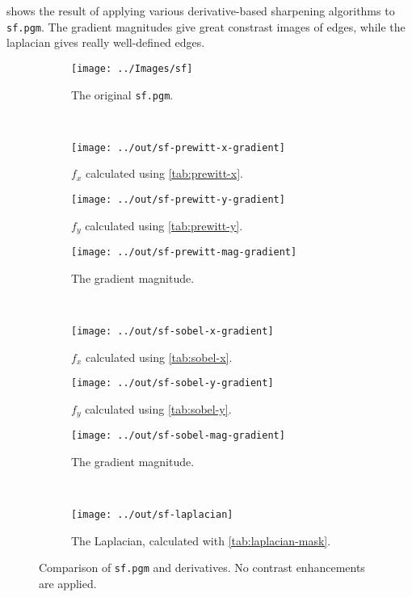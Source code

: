\documentclass[headings=optiontoheadandtoc,listof=totoc,parskip=full]{scrartcl}
\begin{document}
 shows the result of applying various derivative-based sharpening algorithms to \texttt{sf.pgm}. The gradient magnitudes give great constrast images of edges, while the laplacian gives really well-defined edges.

\begin{figure}[H]
	\centering
	\begin{subfigure}[t]{.3\textwidth}
		\centering
		\texttt{[image: ../Images/sf]}
		\caption{The original \texttt{sf.pgm}.}
	\end{subfigure}
	\\
	\begin{subfigure}[t]{.3\textwidth}
		\centering
		\texttt{[image: ../out/sf-prewitt-x-gradient]}
		\caption{$f_x$ calculated using \cref{tab:prewitt-x}.}
	\end{subfigure}
	\hfill
	\begin{subfigure}[t]{.3\textwidth}
		\centering
		\texttt{[image: ../out/sf-prewitt-y-gradient]}
		\caption{$f_y$ calculated using \cref{tab:prewitt-y}.}
	\end{subfigure}
	\hfill
	\begin{subfigure}[t]{.3\textwidth}
		\centering
		\texttt{[image: ../out/sf-prewitt-mag-gradient]}
		\caption{The gradient magnitude.}
	\end{subfigure}
	\\
	\begin{subfigure}[t]{.3\textwidth}
		\centering
		\texttt{[image: ../out/sf-sobel-x-gradient]}
		\caption{$f_x$ calculated using \cref{tab:sobel-x}.}
	\end{subfigure}
	\hfill
	\begin{subfigure}[t]{.3\textwidth}
		\centering
		\texttt{[image: ../out/sf-sobel-y-gradient]}
		\caption{$f_y$ calculated using \cref{tab:sobel-y}.}
	\end{subfigure}
	\hfill
	\begin{subfigure}[t]{.3\textwidth}
		\centering
		\texttt{[image: ../out/sf-sobel-mag-gradient]}
		\caption{The gradient magnitude.}
	\end{subfigure}
	\\
	\begin{subfigure}[t]{.3\textwidth}
		\centering
		\texttt{[image: ../out/sf-laplacian]}
		\caption{The Laplacian, calculated with \cref{tab:laplacian-mask}.}
	\end{subfigure}

	\caption{Comparison of \texttt{sf.pgm} and derivatives. No contrast enhancements are applied.}
	\label{fig:gradient-sf}
\end{figure}
\end{document}
